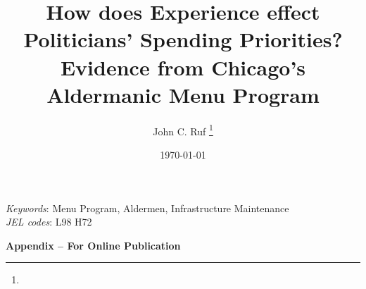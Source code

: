 \documentclass[11pt]{article}
\title{How does Experience effect Politicians' Spending Priorities? Evidence from Chicago's Aldermanic Menu Program}
\author{John C. Ruf \thanks{\rufemail}}
\date{\today}
\renewcommand{\=}[1]{\stackrel{#1}{=}} %
\theoremstyle{definition}
\begin{document}

\maketitle

\begin{abstract}

\end{abstract}
\vspace{1cm}
{\small
\noindent \textit{Keywords}: Menu Program, Aldermen, Infrastructure Maintenance \\
\textit{JEL codes}: L98 H72 
}
\thispagestyle{empty}
\newpage
\setcounter{page}{1}


%
%
%
%









{}

\newpage
\clearpage

\begin{center} \Large \textbf{Appendix -- For Online Publication} \end{center}
\appendix
{}


%
%
\end{document}
